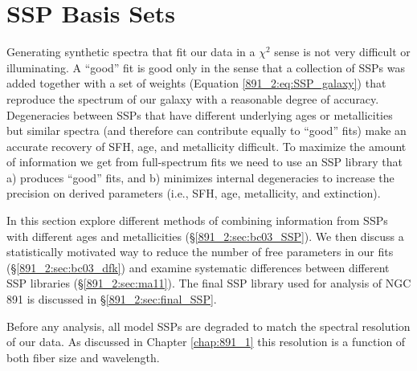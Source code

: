 \section{SSP Basis Sets}
\label{891_2:sec:SSP_sets}

Generating synthetic spectra that fit our data in a $\chi^2$ sense is
not very difficult or illuminating. A ``good'' fit is good only in the
sense that a collection of SSPs was added together with a set of
weights (Equation \ref{891_2:eq:SSP_galaxy}) that reproduce the spectrum of
our galaxy with a reasonable degree of accuracy. Degeneracies between
SSPs that have different underlying ages or metallicities but similar
spectra (and therefore can contribute equally to ``good'' fits) make
an accurate recovery of SFH, age, and metallicity difficult. To
maximize the amount of information we get from full-spectrum fits we
need to use an SSP library that a) produces ``good'' fits, and b)
minimizes internal degeneracies to increase the precision on derived
parameters (i.e., SFH, age, metallicity, and extinction).

In this section explore different methods of combining information
from SSPs with different ages and metallicities
(\S\ref{891_2:sec:bc03_SSP}). We then discuss a statistically
motivated way to reduce the number of free parameters in our fits
(\S\ref{891_2:sec:bc03_dfk}) and examine systematic differences
between different SSP libraries (\S\ref{891_2:sec:ma11}). The final
SSP library used for analysis of NGC 891 is discussed in
\S\ref{891_2:sec:final_SSP}.

Before any analysis, all model SSPs are degraded to match the spectral
resolution of our data. As discussed in Chapter \ref{chap:891_1} this
resolution is a function of both \GP fiber size and wavelength.


